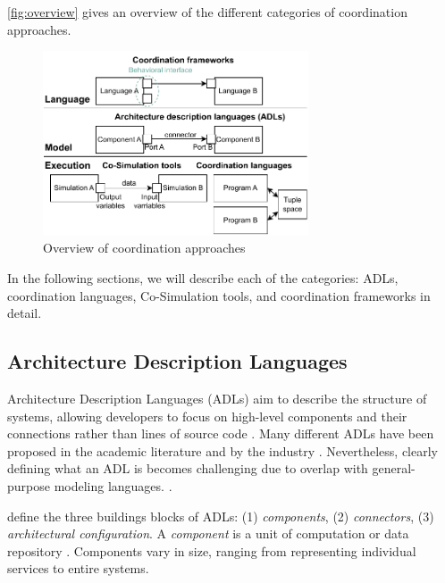 \documentclass[runningheads]{llncs}
\begin{document}
\autoref{fig:overview} gives an overview of the different categories of coordination approaches.

\begin{figure}[ht]
	\centering
	\includegraphics[width=0.7\textwidth]{images/overview}
	\caption{Overview of coordination approaches}
	\label{fig:overview}
\end{figure}

In the following sections, we will describe each of the categories: ADLs, coordination languages, Co-Simulation tools, and coordination frameworks in detail.

\subsection{Architecture Description Languages}
Architecture Description Languages (ADLs) aim to describe the structure of systems, allowing developers to focus on high-level components and their connections rather than lines of source code \cite{clementsSurveyArchitectureDescription1996,medvidovicClassificationComparisonFramework2000,medvidovicFrameworkClassifyingComparing1997}.
Many different ADLs have been proposed in the academic literature and by the industry \cite{medvidovicClassificationComparisonFramework2000,woodsArchitectureDescriptionLanguages2005}.
Nevertheless, clearly defining what an ADL is becomes challenging due to overlap with general-purpose modeling languages. \cite{clementsSurveyArchitectureDescription1996}.

\cite{medvidovicClassificationComparisonFramework2000,medvidovicFrameworkClassifyingComparing1997} define the three buildings blocks of ADLs: (1) \textit{components}, (2) \textit{connectors}, (3) \textit{architectural configuration}.
A \textit{component} is a unit of computation or data repository \cite{medvidovicClassificationComparisonFramework2000}.
Components vary in size, ranging from representing individual services to entire systems.
\end{document}
